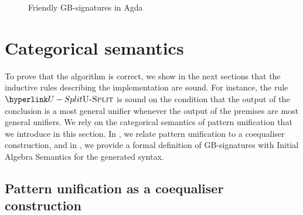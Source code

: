 \begin{figure}
\raggedright{}\caption{Friendly GB-signatures in Agda\label{fig:friendly-gb-agda}}
\end{figure}


\section{Categorical semantics}

\label{sec:cat-settings}To prove that the algorithm is correct, we
show in the next sections that the inductive rules describing the
implementation are sound. For instance, the rule $\refrule{U-Split}$
is sound on the condition that the output of the conclusion is a most
general unifier whenever the output of the premises are most general
unifiers. We rely on the categorical semantics of pattern unification
that we introduce in this section. In ,
we relate pattern unification to a coequaliser construction, and in
, we provide a formal definition of GB-signatures
with Initial Algebra Semantics for the generated syntax. 

\subsection{Pattern unification as a coequaliser construction}

\label{subsec:categorification}

